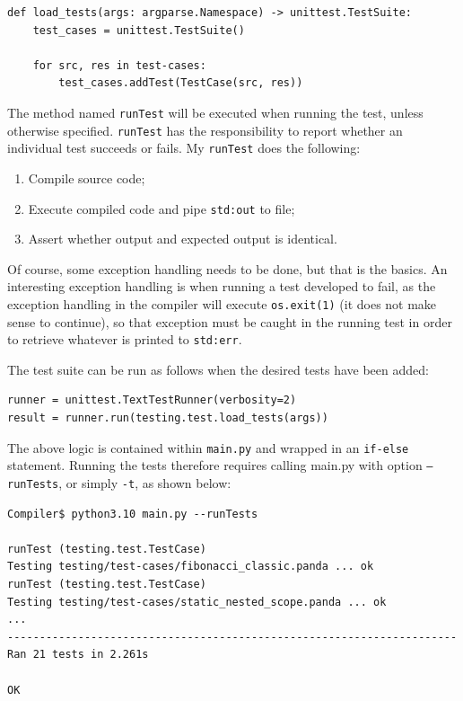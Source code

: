 \begin{verbatim}
def load_tests(args: argparse.Namespace) -> unittest.TestSuite:
    test_cases = unittest.TestSuite()

    for src, res in test-cases:
        test_cases.addTest(TestCase(src, res))
\end{verbatim}

The method named \texttt{runTest} will be executed when running the test, unless otherwise specified. \texttt{runTest} has the responsibility to report whether an individual test succeeds or fails. My \texttt{runTest} does the following:

\begin{enumerate}
    \item Compile source code;
    \item Execute compiled code and pipe \texttt{std:out} to file;
    \item Assert whether output and expected output is identical.
\end{enumerate}

Of course, some exception handling needs to be done, but that is the basics. An interesting exception handling is when running a test developed to fail, as the exception handling in the compiler will execute \texttt{os.exit(1)} (it does not make sense to continue), so that exception must be caught in the running test in order to retrieve whatever is printed to \texttt{std:err}.

The test suite can be run as follows when the desired tests have been added:

\begin{verbatim}
runner = unittest.TextTestRunner(verbosity=2)
result = runner.run(testing.test.load_tests(args))
\end{verbatim}

The above logic is contained within \texttt{main.py} and wrapped in an \texttt{if-else} statement. Running the tests therefore requires calling main.py with option \texttt{--runTests}, or simply \texttt{-t}, as shown below:

\begin{verbatim}
Compiler$ python3.10 main.py --runTests

runTest (testing.test.TestCase)
Testing testing/test-cases/fibonacci_classic.panda ... ok
runTest (testing.test.TestCase)
Testing testing/test-cases/static_nested_scope.panda ... ok
...
----------------------------------------------------------------------
Ran 21 tests in 2.261s

OK 
\end{verbatim}

